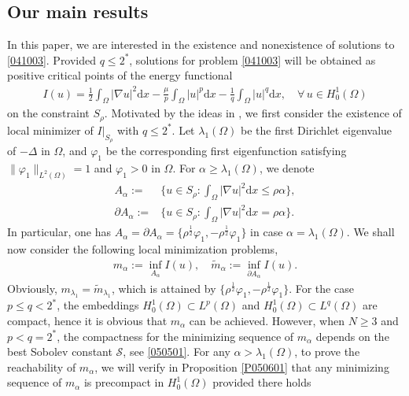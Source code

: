 \documentclass[10pt]{article}
\numberwithin{equation}{section}
\newcommand{\ud}{\mathrm{d}}
\numberwithin{equation}{section}
\begin{document}
\subsection{Our main results}
In this paper, we are interested in the existence and nonexistence of solutions to \eqref{041003}. Provided $q\le 2^*$, solutions for problem \eqref{041003} will be obtained as positive critical points of the energy functional
\begin{equation*}
\begin{aligned}
I(u)=\frac{1}{2}\int_{\Omega}|\nabla u|^2 \ud x
-\frac{\mu}{p}\int_{\Omega}|u|^{p} \ud x
-\frac{1}{q}\int_{\Omega}|u|^{q} \ud x,\quad \forall\, u\in H^1_0(\Omega)
\end{aligned}
\end{equation*}
on the constraint $S_{\rho}$. Motivated by the ideas in \cite{Noris19}, we first consider the existence of local minimizer of $I|_{S_\rho}$ with $q\le 2^*$. Let $\lambda_1(\Omega)$ be the first Dirichlet eigenvalue of $-\Delta$ in $\Omega$, and $\varphi_1$ be the corresponding first eigenfunction  satisfying $\|\varphi_1\|_{L^2(\Omega)}=1$ and $\varphi_1>0$ in $\Omega$. For $\alpha\geq\lambda_1(\Omega)$, we denote
\begin{equation*}
\begin{aligned}
A_{\alpha}:=&\Big\{u \in S_{\rho}:\int_{\Omega} |\nabla u|^2 \ud x\leq \rho \alpha \Big\},\\
\partial A_{\alpha}:=&\Big\{u \in S_{\rho}:\int_{\Omega} |\nabla u|^2 \ud x= \rho \alpha\Big\}.
\end{aligned}
\end{equation*}
In particular, one has $A_\alpha=\partial A_\alpha=\{\rho^{\frac12}\varphi_1, -\rho^{\frac12}\varphi_1\}$ in case $\alpha=\lambda_1(\Omega)$. We shall now consider the following local minimization problems,
\begin{equation}\label{2505261720}
\begin{aligned}
m_{\alpha}:=\inf_{A_{\alpha}} I(u),\quad \widetilde{m}_{\alpha}:=\inf_{\partial A_{\alpha}} I(u).
\end{aligned}
\end{equation}
Obviously, $m_{\lambda_1}=\widetilde{m}_{\lambda_1}$, which is attained by $\{\rho^{\frac12}\varphi_1, -\rho^{\frac12}\varphi_1\}$. For the case $p\le q<2^*$, the embeddings $H_0^1(\Omega)\subset L^p(\Omega)$ and $H_0^1(\Omega)\subset L^q(\Omega)$ are compact, hence it is obvious that $m_\alpha$ can be achieved. However, when $N\ge 3$ and $p<q=2^*$, the compactness for the minimizing sequence of $m_\alpha$ depends on the best Sobolev  constant $\mathcal{S}$, see \eqref{050501}. For any $\alpha>\lambda_{1}(\Omega)$, to prove the reachability of $m_\alpha$, we will verify in Proposition \ref{P050601} that any minimizing sequence of $m_\alpha$ is precompact in $H_0^1(\Omega)$ provided there holds
\end{document}
